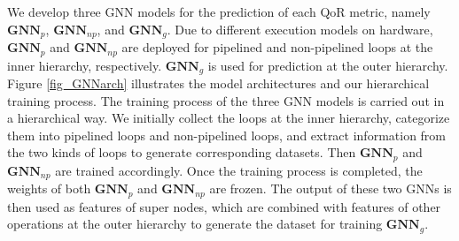 \documentclass[conference]{IEEEtran}
\begin{document}
We develop three GNN models for the prediction of each QoR metric, namely $\textbf{GNN}_p$, $\textbf{GNN}_{np}$, and $\textbf{GNN}_g$. 
Due to different execution models on hardware, $\textbf{GNN}_p$ and $\textbf{GNN}_{np}$ are deployed for pipelined and non-pipelined loops at the inner hierarchy, respectively. $\textbf{GNN}_g$ is used for prediction at the outer hierarchy. Figure \ref{fig_GNNarch} illustrates the model architectures and our hierarchical training process. 
The training process of the three GNN models is carried out in a hierarchical way. We initially collect the loops at the inner hierarchy, categorize them into pipelined loops and non-pipelined loops, and extract information from the two kinds of loops to generate corresponding datasets. Then $\textbf{GNN}_p$ and $\textbf{GNN}_{np}$ are trained accordingly. Once the training process is completed, the weights of both $\textbf{GNN}_p$ and $\textbf{GNN}_{np}$ are frozen. The output of these two GNNs is then used as features of super nodes, which are combined with features of other operations at the outer hierarchy to generate the dataset for training $\textbf{GNN}_g$. 


\end{document}
